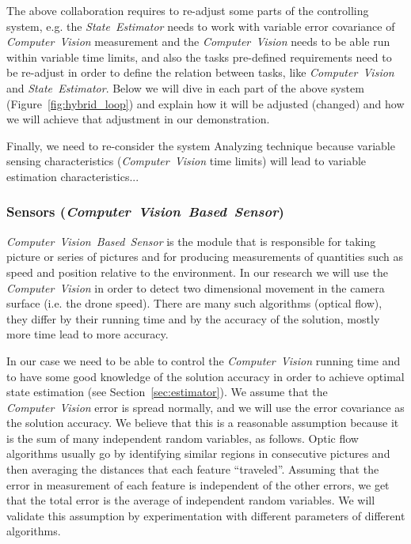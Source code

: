 \documentclass[11pt]{article}
\begin{document}
The above collaboration requires to re-adjust some parts of the controlling system, e.g. the \textit{State~Estimator} needs to work with variable error covariance of \textit{Computer~Vision} measurement and the \textit{Computer~Vision} needs to be able run within variable time limits, and also the tasks pre-defined requirements need to be re-adjust in order to define the relation between tasks, like \textit{Computer~Vision} and \textit{State~Estimator}.
Below we will dive in each part of the above system (Figure~\ref{fig:hybrid_loop}) and explain how it will be adjusted (changed) and how we will achieve that adjustment in our demonstration.

Finally, we need to re-consider the system Analyzing technique because variable sensing characteristics (\textit{Computer~Vision} time limits) will lead to variable estimation characteristics... %

\subsubsection{Sensors (\textit{Computer~Vision~Based~Sensor})}
\label{sec:sensors}

\textit{Computer~Vision~Based~Sensor} is the module that is responsible for taking picture or series of pictures and for producing measurements of quantities such as speed and position relative to the environment.
In our research we will use the \textit{Computer~Vision} in order to detect two dimensional movement in the camera surface (i.e. the drone speed).
There are many such algorithms (optical flow), they differ by their running time and by the accuracy of the solution, mostly more time lead to more accuracy.

In our case we need to be able to control the \textit{Computer~Vision} running time and to have some good knowledge of the solution accuracy in order to achieve optimal state estimation (see Section~\ref{sec:estimator}).
We assume that the \textit{Computer~Vision} error is spread normally, and we will use the error covariance as the solution accuracy. 
We believe that this is a reasonable  assumption because it is the sum of many independent random variables, as follows. Optic flow algorithms usually go by identifying similar regions in consecutive pictures and then averaging the distances that each feature ``traveled''. Assuming that the error in measurement of each feature is independent of the other errors, we get that the total error is the average of independent random variables. We will validate this assumption by experimentation with different parameters of different algorithms.
\end{document}
